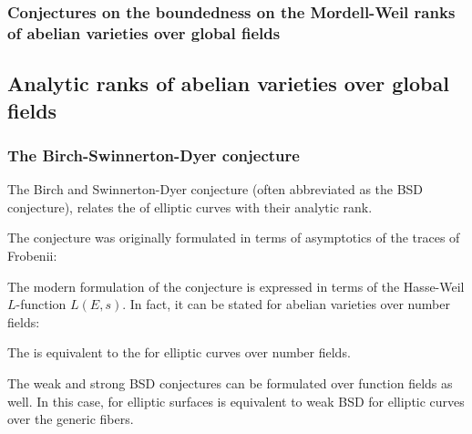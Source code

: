 \subsubsection{Conjectures on the boundedness on the Mordell-Weil ranks of abelian varieties over global fields}


\subsection{Analytic ranks of abelian varieties over global fields}


\subsubsection{The Birch-Swinnerton-Dyer conjecture}

The Birch and Swinnerton-Dyer conjecture (often abbreviated as the BSD conjecture), relates the  of elliptic curves with their analytic rank. 


The conjecture was originally formulated in terms of asymptotics of the traces of Frobenii:



The modern formulation of the conjecture is expressed in terms of the Hasse-Weil $L$-function $L(E,s)$. In fact, it can be stated for abelian varieties over number fields:



The  is equivalent to the  for elliptic curves over number fields. 


The weak and strong BSD conjectures can be formulated over function fields as well. In this case,  for elliptic surfaces is equivalent to weak BSD for elliptic curves over the generic fibers.

